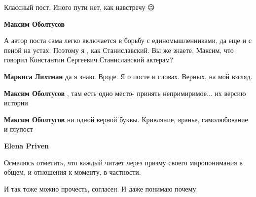 \begin{itemize}
Классный пост. Иного пути нет, как навстречу 😉

\begin{itemize}
 
\textbf{Максим Оболтусов} 

А автор поста сама легко включается в борьбу с единомышленниками, да еще и с
пеной на устах. Поэтому я , как Станиславский. Вы же знаете, Максим, что
говорил Константин Сергеевич Станиславский актерам?

 
\textbf{Маркиса Лихтман} да я знаю. Вроде. Я о посте и словах. Верных, на мой взгляд.

 
\textbf{Максим Оболтусов} , там есть одно место- принять непримиримое... их версию истории

 
\textbf{Максим Оболтусов} ни одной верной буквы. Кривляние, вранье, самолюбование и глупост

 
\textbf{Elena Priven} 

Осмелюсь отметить, что каждый читает через призму своего миропонимания в общем,
и отношения к моменту, в частности.

И так тоже можно прочесть, согласен. И даже понимаю почему.


\end{itemize}
\end{itemize}
